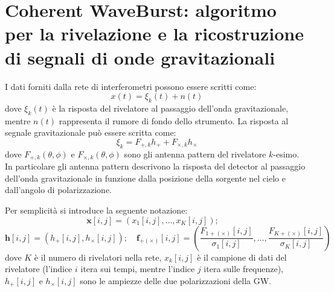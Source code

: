\chapter[Algoritmo Coherent WaveBurst]{Coherent WaveBurst: algoritmo per la rivelazione e la ricostruzione di segnali di onde gravitazionali}
\label{chapter:cwb}
I dati forniti dalla rete di interferometri possono essere scritti come:
\[x(t) = \xi_k(t) + n(t)\]
dove $\xi_k(t)$ è la risposta del rivelatore al passaggio dell'onda gravitazionale, mentre $n(t)$ rappresenta il rumore di fondo dello strumento.
La risposta al segnale gravitazionale può essere scritta come:
\begin{equation}
\xi_k = F_{+,k}h_+ + F_{\times,k}h_\times
\label{eqn:detector_response}
\end{equation}
dove $F_{+,k}(\theta,\phi)$ e $F_{\times,k}(\theta,\phi)$ sono gli antenna pattern del rivelatore $k$-esimo\cite{Klimenko_2008}. In particolare gli antenna pattern descrivono la risposta del detector al passaggio dell'onda gravitazionale in funzione dalla posizione della sorgente nel cielo e dall'angolo di polarizzazione. 

Per semplicità si introduce la seguente notazione:
\[
\mathbf{x}[i,j] = \left(x_1[i,j],\dots, x_K[i,j] \right) ;
\quad
\]
\[
\mathbf{h}[i,j] = (h_+[i,j], h_\times[i,j]);
\quad
\mathbf{f}_{+(\times)}[i,j] = \left(\frac{F_{1+(\times)}[i,j]}{\sigma_1[i,j]},\dots, \frac{F_{K+(\times)}[i,j]}{\sigma_K[i,j]} \right) 
\]
dove $K$ è il numero di rivelatori nella rete, $x_k[i,j]$ è il campione di dati del rivelatore (l'indice $i$ itera sui tempi, mentre l'indice $j$ itera sulle frequenze)\cite{Klimenko_2008}, $h_{+}[i,j]$ e $h_{\times}[i,j]$ sono le ampiezze delle due polarizzazioni della GW.

